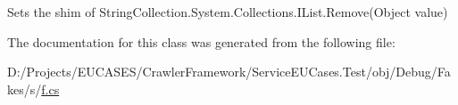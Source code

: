 Sets the shim of String\-Collection.\-System.\-Collections.\-I\-List.\-Remove(\-Object value)



The documentation for this class was generated from the following file\-:\begin{DoxyCompactItemize}
\item 
D\-:/\-Projects/\-E\-U\-C\-A\-S\-E\-S/\-Crawler\-Framework/\-Service\-E\-U\-Cases.\-Test/obj/\-Debug/\-Fakes/s/\hyperlink{s_2f_8cs}{f.\-cs}\end{DoxyCompactItemize}
